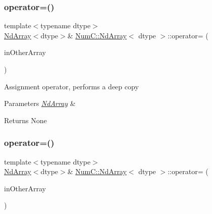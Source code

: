 \subsubsection{\texorpdfstring{operator=()}{operator=()}\hspace{0.1cm}{\footnotesize\ttfamily [1/2]}}
{\footnotesize\ttfamily template$<$typename dtype$>$ \\
\mbox{\hyperlink{class_num_c_1_1_nd_array}{Nd\+Array}}$<$dtype$>$\& \mbox{\hyperlink{class_num_c_1_1_nd_array}{Num\+C\+::\+Nd\+Array}}$<$ dtype $>$\+::operator= (\begin{DoxyParamCaption}\item[{const \mbox{\hyperlink{class_num_c_1_1_nd_array}{Nd\+Array}}$<$ dtype $>$ \&}]{in\+Other\+Array }\end{DoxyParamCaption})\hspace{0.3cm}{\ttfamily [inline]}}

Assignment operator, performs a deep copy


\begin{DoxyParams}{Parameters}
{\em \mbox{\hyperlink{class_num_c_1_1_nd_array}{Nd\+Array}}} & \\
\hline
\end{DoxyParams}
\begin{DoxyReturn}{Returns}
None 
\end{DoxyReturn}
\mbox{\label{class_num_c_1_1_nd_array_a7c463b2a87b68f63eeb83c88c55ffbe4}} 
\subsubsection{\texorpdfstring{operator=()}{operator=()}\hspace{0.1cm}{\footnotesize\ttfamily [2/2]}}
{\footnotesize\ttfamily template$<$typename dtype$>$ \\
\mbox{\hyperlink{class_num_c_1_1_nd_array}{Nd\+Array}}$<$dtype$>$\& \mbox{\hyperlink{class_num_c_1_1_nd_array}{Num\+C\+::\+Nd\+Array}}$<$ dtype $>$\+::operator= (\begin{DoxyParamCaption}\item[{\mbox{\hyperlink{class_num_c_1_1_nd_array}{Nd\+Array}}$<$ dtype $>$ \&\&}]{in\+Other\+Array }\end{DoxyParamCaption})\hspace{0.3cm}{\ttfamily [inline]}}

